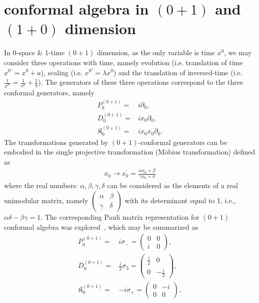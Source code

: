 \documentclass[%
 reprint,
superscriptaddress,
 amsmath,amssymb,
 aps,
]{revtex4-2}
\begin{document}
\section{conformal algebra in \texorpdfstring{$(0+1)$}
{Lg} and \texorpdfstring{$(1+0)$}{Lg} dimension}
\label{sec:conformal0110}
 In 0-space \& 1-time $(0+1)$ dimension, as the only variable is time $x^0$, we may consider three operations with time, namely evolution (i.e. translation of time $x^{0\prime}=x^0+a$), scaling (i.e. $x^{0\prime} = \lambda x^0$) and the translation of inversed-time (i.e. $\frac{1}{x^{0\prime}}=\frac{1}{x^0}+\frac{1}{b}$). The generators of these three operations correspond to the three conformal generators, namely
\begin{align}
    P^{(0+1)}_{0}=&i\partial_{0},\label{P01}\\
    D^{(0+1)}_{0}=&ix_{0}\partial_{0},\label{D01}\\
    \mathfrak{K}^{(0+1)}_{{0}}=&ix_{0}x_{0}\partial_{{0}}.\label{KK01}
\end{align}
The transformations generated by $(0+1)$-conformal generators can be embodied in the single projective transformation (Möbius transformation) defined as
\begin{align}
    x_{0}\rightarrow x^{\prime}_{0}=\frac{\alpha x_{0} +\beta}{\gamma x_{0} +\delta}
\end{align}
where the real numbers: $\alpha, \beta, \gamma, \delta$ can be considered as the elements of a real unimodular matrix, namely $\begin{pmatrix}
    \alpha &  \beta \\
   \gamma & \delta
\end{pmatrix}$ with its determinant equal to 1, i.e., $\alpha\delta-\beta\gamma=1$. The corresponding Pauli matrix representation for $(0+1)$ conformal algebra was explored~\cite{Fubini1976}, which may be summarized as 
\begin{align}
    P^{(0+1)}_{0}=&i\sigma_{-}=\begin{pmatrix}
        0&0\\
        i&0
    \end{pmatrix},\label{P01Pauli}\\
    D^{(0+1)}_{0}=&\frac{i}{2}\sigma_{3}=\begin{pmatrix}
        \frac{i}{2}&0\\
        0&-\frac{i}{2}
    \end{pmatrix},\label{D01Pauli}\\
    \mathfrak{K}^{(0+1)}_{{0}}=&-i\sigma_{+}=\begin{pmatrix}
        0&-i\\
        0&0
    \end{pmatrix},\label{KK01Pauli}
\end{align}
\end{document}
